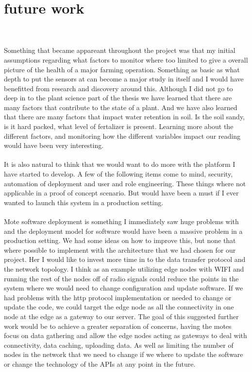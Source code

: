 \documentclass[]{uiophd}
\begin{document}
\section{future work}
\\\\
Something that became appareant throughout the project was that my initial assumptions regarding what factors to monitor where too limited to give  a overall picture of the health of a major farming operation. Something as basic as what depth to put the sensors at can become a  major study in itself and I would have benefitted from research and discovery around this. Although I did not go to deep in to the plant science part of the thesis we have learned that there are many factors that contribute to the state of a plant. And we have also learned that there are many factors that impact water retention in soil. Is the soil sandy, is it hard packed, what level of fertalizer is present. Learning more about the different factors, and monitoring how the different variables impact our reading would have been very interesting.
\\\\
It is also natural to think that we would want to do more with the platform I have started to develop. A few of the following items come to mind, security, automation of deployment and user and role engineering. These things where not applicable in a proof of concept scenario. But would have been a must if I ever wanted to  launch this system in a production setting.
\\\\
Mote software deployment is something I immediately saw huge problems with and the deployment model for software would have been a massive problem in a production setting. We had some ideas on how to improve this, but none that where possible to implement with the architecture that we had chosen for our project. Her I would like to invest more time in to the data transfer protocol and the network topology. I think as an example utilizing edge nodes with WIFI and running the rest of the nodes off of radio signals could reduce the points in the system where we would need to change configuration and update software. If we had problems with the http protocol implementation or needed to change or update the code, we could target the edge node as all the connectivity in one node at the edge as a gateway to our server. The goal of this suggested further work would be to achieve a greater separation of concerns, having the motes focus on data gathering and allow the edge nodes acting as gateways to deal with connectivity, data caching, uploading data. As well as limiting the number of nodes in the network that we need to change if we where to update the software or change the technology of the APIs at any point in the future.
\end{document}
